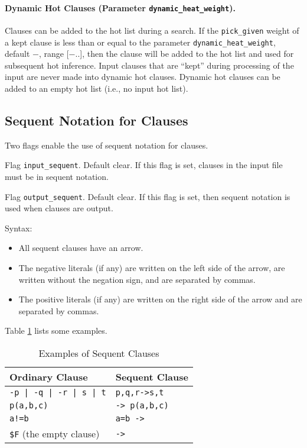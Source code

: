 \documentclass[11pt]{article}
\begin{document}
\paragraph{Dynamic Hot Clauses (Parameter {\tt dynamic\_heat\_weight}).}
Clauses can be added to the hot list during a search.  If the
\verb:pick_given: weight of a kept clause is less than or equal to the
parameter \verb:dynamic_heat_weight:, default $-$\maxint , range
[$-$\maxint ..\maxint], then
the clause will be added to the hot list and used for subsequent hot
inference.  Input clauses that are ``kept'' during processing of the
input are never made into dynamic hot clauses.  Dynamic hot clauses
can be added to an empty hot list (i.e., no input hot list).

\subsection{Sequent Notation for Clauses} \label{sequent}

Two flags enable the use of sequent notation for clauses.

\noindent
Flag \verb:input_sequent:.  Default clear.  If this flag is set,
clauses in the input file must be in sequent notation.

\noindent
Flag \verb:output_sequent:.  Default clear.  If this flag is set,
then sequent notation is used when clauses are output.

\noindent Syntax:

\begin{itemize}
\item
All sequent clauses have an arrow.
\item
The negative literals (if any) are written on the left side of the arrow,
are written without the negation sign, and are separated by commas.
\item
The positive literals (if any) are written on the right side of the arrow
and are separated by commas.
\end{itemize}

\noindent Table \ref{sequent-tab} lists some examples.
\begin{table}[ht] \centering
\caption{Examples of Sequent Clauses}   \label{sequent-tab}
\begin{tabular}{l|l}
\hline
Ordinary Clause & Sequent Clause \\
\hline
\verb:-p | -q | -r | s | t: & \verb:p,q,r->s,t: \\
\verb:p(a,b,c): & \verb:-> p(a,b,c): \\
\verb:a!=b: & \verb:a=b ->: \\
\verb:$F: (the empty clause) & \verb:->: \\
\hline
\end{tabular}
\end{table}
\end{document}
